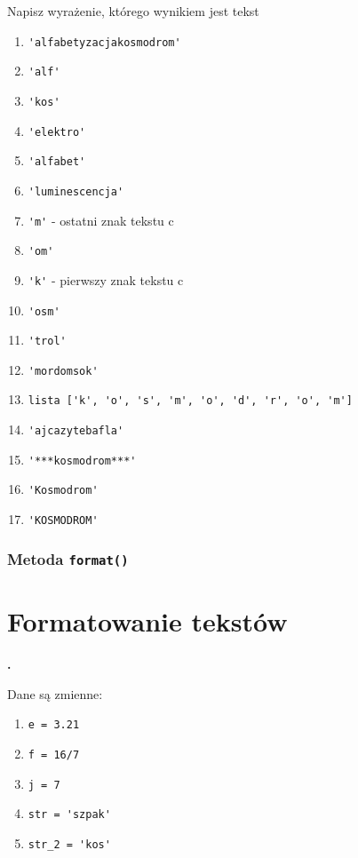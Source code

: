 \documentclass[a4paper]{article}
\begin{document}
Napisz wyrażenie, którego wynikiem jest tekst
\begin{enumerate}[label=\arabic*.]
    \item \verb|'alfabetyzacjakosmodrom'|
    \item \verb|'alf'|
    \item \verb|'kos'|
    \item \verb|'elektro'|
    \item \verb|'alfabet'|
    \item \verb|'luminescencja'|
    \item \verb|'m'| - ostatni znak tekstu c
    \item \verb|'om'|
    \item \verb|'k'| - pierwszy znak tekstu c
    \item \verb|'osm'|
    \item \verb|'trol'|
    \item \verb|'mordomsok'|
    \item \verb|lista ['k', 'o', 's', 'm', 'o', 'd', 'r', 'o', 'm']|
    \item \verb|'ajcazytebafla'|

    \item \verb|'***kosmodrom***'|
    \item \verb|'Kosmodrom'|
    \item \verb|'KOSMODROM'|


\end{enumerate}

\subsubsection{Metoda \texttt{format()}}

\section{Formatowanie tekstów}

\textbf{.}\addtocounter{zadanie}{1} Dane są zmienne:
\begin{enumerate}[ ]
    \item \verb|e = 3.21|
    \item \verb|f = 16/7|
    \item \verb|j = 7|
    \item \verb|str = 'szpak'|
    \item \verb|str_2 = 'kos'|
\end{enumerate}
\end{document}
